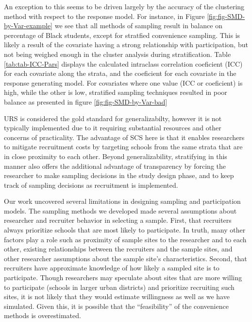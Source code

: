 \documentclass[man,floatsintext]{apa6}
\begin{document}
An exception to this seems to be driven largely by the accuracy of the clustering method with respect to the response model. For instance, in Figure \ref{fig:fig-SMD-by-Var-example} we see that all methods of sampling result in balance on percentage of Black students, except for stratfied convenience sampling. This is likely a result of the covariate having a strong relationship with participation, but not being weighed enough in the cluster analysis during stratification. Table \ref{tab:tab-ICC-Pars} displays the calculated intraclass correlation coeficient (ICC) for each covariate along the strata, and the coeficient for each covariate in the response generating model. For covariates where one value (ICC or coeficient) is high, while the other is low, stratified sampling techniques resulted in poor balance as presented in figure \ref{fig:fig-SMD-by-Var-bad}

URS is considered the gold standard for generalizabilty, however it is not typically implemented due to it requiring substantial resources and other concerns of practicality. The advantage of SCS here is that it enables researchers to mitigate recruitment costs by targeting schools from the same strata that are in close proximity to each other. Beyond generalizability, stratifying in this manner also offers the additional advantage of transparency by forcing the researcher to make sampling decisions in the study design phase, and to keep track of sampling decisions as recruitment is implemented.

Our work uncovered several limitations in designing sampling and participation models. The sampling methods we developed made several assumptions about researcher and recruiter behavior in selecting a sample. First, that recruiters always prioritize schools that are most likely to participate. In truth, many other factors play a role such as proximity of sample sites to the researcher and to each other, existing relationships between the recruiters and the sample sites, and other researcher assumptions about the sample site's characteristics. Second, that recruiters have approximate knowledge of how likely a sampled site is to participate. Though researchers may speculate about sites that are more willing to participate (schools in larger urban districts) and prioritize recruiting such sites, it is not likely that they would estimate willingness as well as we have simulated. Given this, it is possible that the \enquote{feasibility} of the convenience methods is overestimated.
\end{document}
